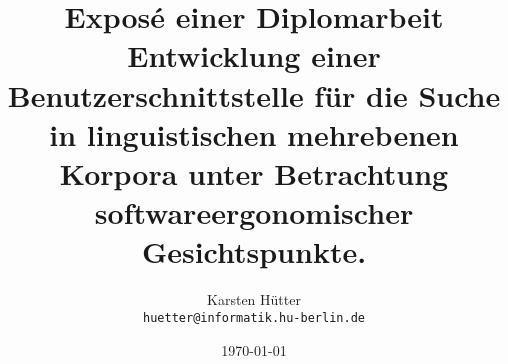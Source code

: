 \documentclass[a4paper, 11pt, oneside, final]{article}
\begin{document}
\begin{titlepage}
\title{Exposé einer Diplomarbeit\\ Entwicklung einer Benutzerschnittstelle für die Suche in linguistischen mehrebenen Korpora unter Betrachtung softwareergonomischer Gesichtspunkte.}
\author{Karsten Hütter\\ \tt{huetter@informatik.hu-berlin.de}}
\date{\today}
\maketitle
\thispagestyle{empty}
\quad
\end{titlepage}

\setcounter{page}{2}







\newpage




%
\end{document}
